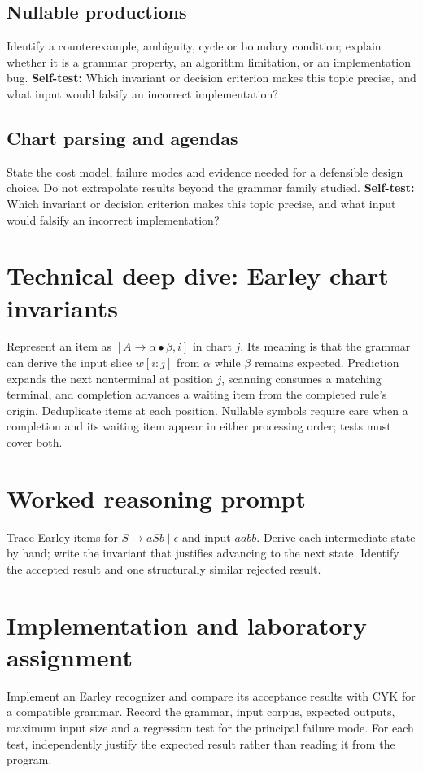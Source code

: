 \documentclass[11pt,letterpaper]{article}
\begin{document}
\subsection{Nullable productions}
Identify a counterexample, ambiguity, cycle or boundary condition; explain whether it is a grammar property, an algorithm limitation, or an implementation bug.
\textbf{Self-test:} Which invariant or decision criterion makes this topic precise, and what input would falsify an incorrect implementation?
\subsection{Chart parsing and agendas}
State the cost model, failure modes and evidence needed for a defensible design choice. Do not extrapolate results beyond the grammar family studied.
\textbf{Self-test:} Which invariant or decision criterion makes this topic precise, and what input would falsify an incorrect implementation?
\section{Technical deep dive: Earley chart invariants}
Represent an item as $[A\to\alpha\bullet\beta,i]$ in chart $j$. Its meaning is that the grammar can derive the input slice $w[i:j]$ from $\alpha$ while $\beta$ remains expected. Prediction expands the next nonterminal at position $j$, scanning consumes a matching terminal, and completion advances a waiting item from the completed rule's origin. Deduplicate items at each position. Nullable symbols require care when a completion and its waiting item appear in either processing order; tests must cover both.
\section{Worked reasoning prompt}
Trace Earley items for $S\to aSb\mid\epsilon$ and input $aabb$. Derive each intermediate state by hand; write the invariant that justifies advancing to the next state. Identify the accepted result and one structurally similar rejected result.
\section{Implementation and laboratory assignment}
Implement an Earley recognizer and compare its acceptance results with CYK for a compatible grammar. Record the grammar, input corpus, expected outputs, maximum input size and a regression test for the principal failure mode. For each test, independently justify the expected result rather than reading it from the program.
\end{document}
